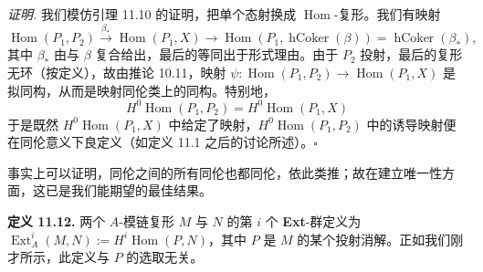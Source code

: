 \textit{证明.} 我们模仿引理 11.10 的证明，把单个态射换成 $\operatorname{Hom}$-复形。我们有映射
\[
\operatorname{Hom}(P_1,P_2)\xrightarrow{\ \beta_*\ }\operatorname{Hom}(P_1,X)\to\operatorname{Hom}(P_1,\operatorname{hCoker}(\beta))=\operatorname{hCoker}(\beta_*),
\]
其中 $\beta_*$ 由与 $\beta$ 复合给出，最后的等同出于形式理由。由于 $P_2$ 投射，最后的复形无环（按定义），故由推论 10.11，映射 $\psi\colon\operatorname{Hom}(P_1,P_2)\to\operatorname{Hom}(P_1,X)$ 是拟同构，从而是映射同伦类上的同构。特别地，
\[
H^0\operatorname{Hom}(P_1,P_2)=H^0\operatorname{Hom}(P_1,X)
\]
于是既然 $H^0\operatorname{Hom}(P_1,X)$ 中给定了映射，$H^0\operatorname{Hom}(P_1,P_2)$ 中的诱导映射便在同伦意义下良定义（如定义 11.1 之后的讨论所述）。\hfill$\square$

事实上可以证明，同伦之间的所有同伦也都同伦，依此类推；故在建立唯一性方面，这已是我们能期望的最佳结果。

\textbf{定义 11.12.} 两个 $A$-模链复形 $M$ 与 $N$ 的第 $i$ 个 \textbf{Ext}-群定义为 $\operatorname{Ext}^i_A(M,N):=H^i\operatorname{Hom}(P,N)$，其中 $P$ 是 $M$ 的某个投射消解。正如我们刚才所示，此定义与 $P$ 的选取无关。
